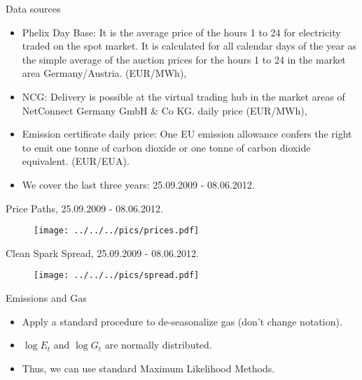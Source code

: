 

{Data sources}
\begin{itemize}
\item Phelix Day Base: It is the average price of the hours 1 to 24 for electricity traded on the spot market.
It is calculated for all calendar days of the year as the simple average of the auction prices for the
hours 1 to 24 in the market area Germany/Austria. (EUR/MWh),
\item NCG: Delivery is possible at the virtual trading hub in the market areas of
NetConnect Germany GmbH \& Co KG. daily price (EUR/MWh),
\item Emission certificate daily price: One EU emission allowance confers the right to emit one tonne of carbon dioxide or one tonne of
carbon dioxide equivalent. (EUR/EUA).
\item We cover the last three years: 25.09.2009 - 08.06.2012.
\end{itemize}


{Price Paths, 25.09.2009 - 08.06.2012.}
\begin{figure}[htp]
\centering
\texttt{[image: ../../../pics/prices.pdf]}
\label{prices}
\end{figure}


{Clean Spark Spread, 25.09.2009 - 08.06.2012.}
\begin{figure}[htp]
\centering
\texttt{[image: ../../../pics/spread.pdf]}
\label{spread}
\end{figure}


{Emissions and Gas}
\begin{itemize}
\item Apply a standard procedure to de-seasonalize gas (don't change notation).
\item $\log E_t$ and $\log G_t$ are normally distributed.
\item Thus, we can use standard Maximum Likelihood Methods.
\end{itemize}



